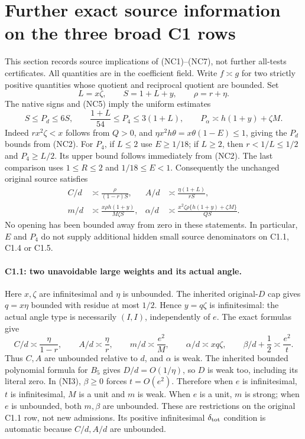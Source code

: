 \section{\texorpdfstring{Further exact source information on the three broad C1 rows}{Further exact source information on the three broad C1 rows}}
\label{component:p51451360ff4a}

\label{p51451360ff4a:sec:c1-residual-source-implications}

This section records source implications of (NC1)--(NC7), not further
all-tests certificates. All quantities are in the coefficient field.
Write $f\asymp g$ for two strictly positive quantities whose quotient
and reciprocal quotient are bounded. Set
\[
             L=x\zeta,\qquad S=1+L+y,\qquad \rho=r+\eta.
\]
The native signs and (NC5) imply the uniform estimates
\[
 S\le P_d\le6S,\qquad
 \frac{1+L}{54}\le P_4\le3(1+L),\qquad
 P_\alpha\asymp h(1+y)+\zeta M.                 \tag{NI1}
\]
Indeed $rx^2\zeta<x$ follows from $Q>0$, and
$\eta x^2h\theta=x\theta(1-E)\le1$, giving the $P_d$ bounds
from (NC2). For $P_4$, if $L\le2$ use $E\ge1/18$; if $L\ge2$,
then $r<1/L\le1/2$ and $P_4\ge L/2$. Its upper bound follows
immediately from (NC2). The last comparison uses $1\le R\le2$
and $1/18\le E<1$.
Consequently the unchanged original source satisfies
\begin{align*}
 C/d&\asymp\frac{\rho}{(1-r)S},&
 A/d&\asymp\frac{\eta(1+L)}{rS},\\
 m/d&\asymp\frac{x\rho h(1+y)}{M\zeta S},&
 \alpha/d&\asymp
 \frac{x^2\zeta\rho\{h(1+y)+\zeta M\}}{QS}.
 \tag{NI2}
\end{align*}
No opening has been bounded away from zero in these statements.
In particular, $E$ and $P_4$ do not supply additional hidden small
source denominators on C1.1, C1.4 or C1.5.

\paragraph{C1.1: two unavoidable large weights and its actual angle.}
Here $x,\zeta$ are infinitesimal and $\eta$ is unbounded.
The inherited original-$D$ cap gives $q=x\eta$ bounded with
residue at most $1/2$. Hence $y=q\zeta$ is infinitesimal:
the actual angle type is necessarily $(I,I)$, independently of $e$.
The exact formulas give
\[
 C/d\asymp\frac{\eta}{1-r},\qquad
 A/d\asymp\frac{\eta}{r},\qquad
 m/d\asymp\frac{e^2}{M},\qquad
 \alpha/d\asymp xq\zeta,\qquad
 \beta/d+\frac12\asymp\frac{e^2}{t}.             \tag{NI3}
\]
Thus $C,A$ are unbounded relative to $d$, and $\alpha$ is weak.
The inherited bounded polynomial formula for $B_5$ gives $D/d=O(1/\eta)$,
so $D$ is weak too, including its literal zero. In (NI3), $\beta\ge0$
forces $t=O(e^2)$. Therefore when $e$ is infinitesimal, $t$ is
infinitesimal, $M$ is a unit and $m$ is weak. When $e$ is a unit,
$m$ is strong; when $e$ is unbounded, both $m,\beta$ are unbounded.
These are restrictions on the original C1.1 row, not new admissions.
Its positive infinitesimal $\delta_{\rm tot}$ condition is automatic
because $C/d,A/d$ are unbounded.

